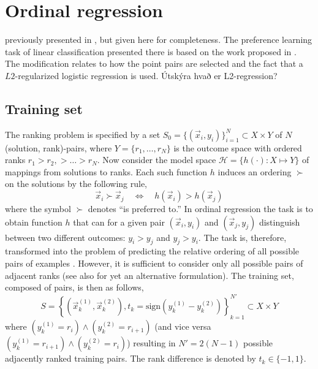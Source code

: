 
\chapter{Ordinal regression}\label{ch:ordinal} 

 previously presented in \cite{Ru06:PPSN}, but given here for completeness. The preference learning task of linear classification presented there is based on the work proposed in \citep{liblinear,Lin08:newtontrustregion}. The modification relates to how the point pairs are selected and the fact that a $L2$-regularized logistic regression is used. {\color{red}Útskýra hvað er L2-regression?}

\section{Training set}
The ranking problem is specified by a set $S_{0} = \{(\vec{x}_i,y_i)\}_{i=1}^N \subset X \times Y$ of $N$ (solution, rank)-pairs, where $Y=\{r_1,\ldots,r_N\}$ is the outcome space with ordered ranks $r_1> r_2,> \ldots > r_N$.  
Now consider the model space $\mathcal{H} = \{h(\cdot) : X \mapsto Y\}$ of mappings from solutions to ranks. Each such function $h$ induces an ordering $\succ$ on the solutions  by the following rule,
\begin{equation}\label{eq:linear}
\vec{x}_i \succ \vec{x}_j \quad \Leftrightarrow \quad h(\vec{x}_i) > h(\vec{x}_j)
\end{equation}
where the symbol $\succ$ denotes ``is preferred to.''  In ordinal regression the task is to obtain function $h$ that can for a given pair $(\vec{x}_i,y_i)$ and $(\vec{x}_j,y_j)$ distinguish between two different outcomes: $y_i > y_j$ and $y_j > y_i$. The task is, therefore, transformed into the problem of predicting the relative ordering of all possible pairs of examples \citep{Herbrich00,Joachims02}.  However, it is sufficient to consider only all possible pairs of adjacent ranks (see also \cite{ShaweTaylor04:book} for yet an alternative formulation).  The training set, composed of pairs, is then as follows,
\begin{equation}
S = \left\{(\vec{x}_k^{(1)}, \vec{x}_k^{(2)}),t_k=\text{sign}(y_k^{(1)} - y_k^{(2)})\right\}_{k=1}^{N'} \subset X\times Y  \label{eq:S}
\end{equation}
where $(y_k^{(1)} = r_i) \wedge (y_k^{(2)} = r_{i+1})$ (and vice versa $(y_k^{(1)} = r_{i+1}) \wedge (y_k^{(2)} = r_{i})$) resulting in $N'=2(N-1)$ possible adjacently ranked training pairs. The rank difference is denoted by $t_k\in\{-1,1\}$.

